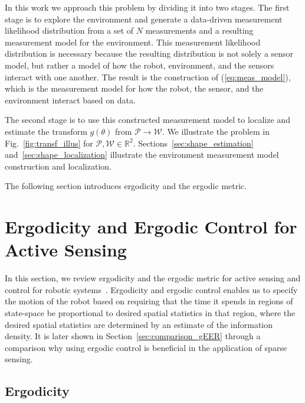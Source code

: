 \documentclass[conference]{IEEEtran}
\begin{document}
In this work we approach this problem by dividing it into two stages.
The first stage is to explore the environment and generate a data-driven measurement likelihood distribution from a set of $N$ measurements and a resulting measurement model for the environment.
This measurement likelihood distribution is necessary because the resulting distribution is not solely a sensor model, but rather a model of how the robot, environment, and the sensors interact with one another. 
The result is the construction of (\ref{eq:meas_model}), which is the measurement model for how the robot, the sensor, and the environment interact based on data.

The second stage is to use this constructed measurement model to localize and estimate the transform $g(\theta)$ from $\mathcal{P} \to \mathcal{W}$.
We illustrate the problem in Fig.~\ref{fig:transf_illus} for $\mathcal{P}, \mathcal{W} \in \mathbb{R}^2$.
Sections~\ref{sec:shape_estimation} and~\ref{sec:shape_localization} illustrate the environment measurement model construction and localization.

The following section introduces ergodicity and the ergodic metric.

 
\section{Ergodicity and Ergodic Control for Active Sensing}
\label{sec:erg}
In this section, we review ergodicity and the ergodic metric for active sensing and control for robotic systems~\cite{shellMult06ergodic, mathew2011metrics}.
Ergodicity and ergodic control enables us to specify the motion of the robot based on requiring that the time it spends in regions of state-space be proportional to desired spatial statistics in that region, where the desired spatial statistics are determined by an estimate of the information density.
It is later shown in Section~\ref{sec:comparison_gEER} through a comparison why using ergodic control is beneficial in the application of sparse sensing.

\subsection{Ergodicity}
\end{document}
